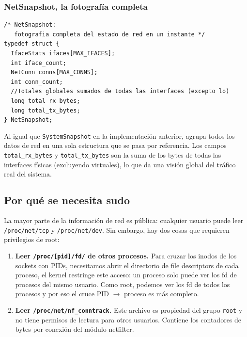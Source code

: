 \documentclass[12pt,letterpaper]{article}
\begin{document}
\subsubsection*{NetSnapshot, la fotografía completa}

\begin{lstlisting}[style=modernc, caption={\texttt{net\_monitor.h} struct NetSnapshot}]
/* NetSnapshot:
   fotografia completa del estado de red en un instante */
typedef struct {
  IfaceStats ifaces[MAX_IFACES];
  int iface_count;
  NetConn conns[MAX_CONNS];
  int conn_count;
  //Totales globales sumados de todas las interfaces (excepto lo)
  long total_rx_bytes;
  long total_tx_bytes;
} NetSnapshot;
\end{lstlisting}

Al igual que \texttt{SystemSnapshot} en la implementación anterior, agrupa todos los datos de red en una sola
estructura que se pasa por referencia. Los campos \texttt{total\_rx\_bytes} y \texttt{total\_tx\_bytes} son la
suma de los bytes de todas las interfaces físicas (excluyendo virtuales), lo que da una visión global del
tráfico real del sistema.

\subsection*{Por qué se necesita sudo}

La mayor parte de la información de red es pública: cualquier usuario puede leer \texttt{/proc/net/tcp} y
\texttt{/proc/net/dev}. Sin embargo, hay dos cosas que requieren privilegios de root:

\begin{enumerate}[leftmargin=1.5cm]
\item \textbf{Leer \texttt{/proc/[pid]/fd/} de otros procesos.} Para cruzar los inodos de los sockets con PIDs,
  necesitamos abrir el directorio de file descriptors de cada proceso, el kernel restringe este acceso: un
  proceso solo puede ver los fd de procesos del mismo usuario. Como root, podemos ver los fd de todos los
  procesos y por eso el cruce PID $\to$ proceso es más completo.
  
\item \textbf{Leer \texttt{/proc/net/nf\_conntrack}.} Este archivo es propiedad del grupo \texttt{root} y no
  tiene permisos de lectura para otros usuarios. Contiene los contadores de bytes por conexión del módulo
  netfilter.
\end{enumerate}
\end{document}
